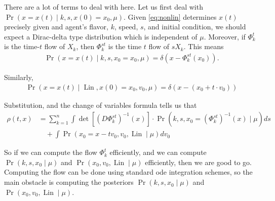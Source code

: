 \documentclass[12pt]{amsart}
\DeclareMathOperator{\Lin}{Lin}
\begin{document}
There are a lot of terms to deal with here.
Let us first deal with $\Pr( x = x(t) \mid k,s, x(0) = x_0, \mu )$.
Given \eqref{eq:nonlin} determines $x(t)$ precisely given and agent's flavor, $k$, speed, $s$, and initial condition,
we should expect a Dirac-delta type distribution which is independent of $\mu$.
Moreover, if $\Phi_k^t$ is the time-$t$ flow of $X_k$, then $\Phi_k^{st}$ is the time $t$ flow of $s X_k$. 
This means
\begin{align*}
	\Pr( x  = x(t) \mid k,s, x_0 = x_0 , \mu ) = \delta( x - \Phi_k^{st}( x_0) ).
\end{align*}

Similarly,
\begin{align*}
	\Pr( x = x(t) \mid \Lin, x(0) = x_0, v_0 , \mu ) = \delta \left( x - (x_0 + t \cdot v_0 ) \right)
\end{align*}

Substitution, and the change of variables formula tells us that
\begin{align*}
	\rho(t,x) &= \sum_{k=1}^n \int \det \left[ (D\Phi_{k}^{st})^{-1}(x)  \right] \cdot \Pr( k, s, x_0 = (\Phi_{k}^{st})^{-1} (x) \mid \mu) ds \\
		&\quad + \int \Pr( x_0 = x- t v_0 ,v_0, \Lin \mid \mu)dv_0
\end{align*}

So if we can compute the flow $\Phi_k^{t}$ efficiently, and we can compute $\Pr( k,s,x_0 \mid \mu)$ and $\Pr( x_0, v_0, \Lin \mid \mu)$ efficiently, then we are good to go.
Computing the flow can be done using standard ode integration schemes, so the main obstacle is computing the posteriors $\Pr( k,s,x_0 \mid \mu)$ and $\Pr( x_0, v_0, \Lin \mid \mu)$.
\end{document}
